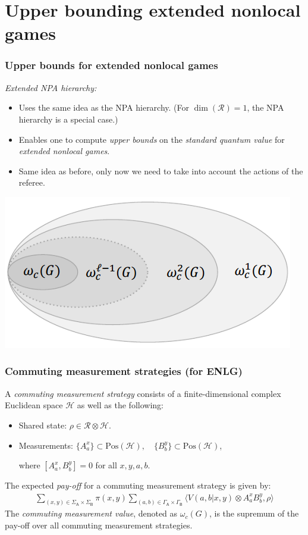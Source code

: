 \documentclass{beamer}
\newcommand{\biggip}[2]{\biggl\langle #1, #2 \biggr\rangle}
\def\H{\mathcal{H}}
\def\R{\mathcal{R}}
\def \GammaA{\Gamma_{\reg{A}}}
\def \GammaB{\Gamma_{\reg{B}}}
\def \SigmaA{\Sigma_{\reg{A}}}
\def \SigmaB{\Sigma_{\reg{B}}}
\newcommand{\setft}[1]{\mathrm{#1}}
\newcommand{\Pos}{\setft{Pos}}
\newcommand{\reg}[1]{\mathsf{#1}}
\begin{document}
  \section{Upper bounding extended nonlocal games}


\begin{frame}
	\frametitle{Upper bounds for extended nonlocal games}
	\emph{Extended NPA hierarchy:}
	\begin{itemize}
		\item Uses the same idea as the NPA hierarchy. (For $\dim(\R) = 1$, the NPA hierarchy is a special case.)
		\item Enables one to compute \emph{upper bounds} on the \emph{standard quantum value} for \emph{extended nonlocal games}. 
		\item Same idea as before, only now we need to take into account the actions of the referee. 
	\end{itemize}
	\begin{center}
		\includegraphics[scale=0.5]{figures/CommutingValues}
	\end{center}	
\end{frame}

\begin{frame}
	\frametitle{Commuting measurement strategies (for ENLG)}
	A \emph{commuting measurement strategy} consists of a finite-dimensional complex Euclidean space $\H$ as well as the following:
	\begin{itemize}
		\item Shared state: $\rho \in \R \otimes \H$.
		\item Measurements: $\{ A_a^x \} \subset \Pos(\H), \quad \{ B_b^y \} \subset \Pos(\H)$,
			
			where $[A_a^x, B_b^y] = 0$ for all $x,y,a,b$. 
	\end{itemize}
	\pause
	\vspace{5mm}
	The expected \emph{pay-off} for a commuting measurement strategy is given by:
	\begin{align*}
		\sum_{(x,y) \in \SigmaA \times \SigmaB} \pi(x,y) \sum_{(a,b) \in \GammaA \times \GammaB} \biggip{V(a,b|x,y) \otimes A_a^x B_b^y}{\rho}
	\end{align*}
	The \emph{commuting measurement value}, denoted as $\omega_c(G)$, is the supremum of the pay-off over all commuting measurement strategies.
\end{frame}
\end{document}
